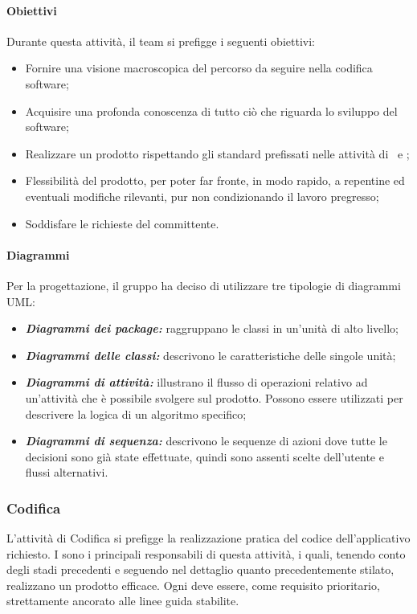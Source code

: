 		\paragraph{Obiettivi}
		Durante questa attività, il team si prefigge i seguenti obiettivi:
		\begin{itemize}
			\item Fornire una visione macroscopica del percorso da seguire nella codifica software;
			\item Acquisire una profonda conoscenza di tutto ciò che riguarda lo sviluppo del software;
			\item Realizzare un prodotto rispettando gli standard prefissati nelle attività di \SdF\ e \AdR;
			\item Flessibilità del prodotto, per poter far fronte, in modo rapido, a repentine ed eventuali modifiche rilevanti, pur non condizionando il lavoro pregresso;
			\item Soddisfare le richieste del committente.
		\end{itemize}
	\paragraph{Diagrammi}
	Per la progettazione, il gruppo ha deciso di utilizzare tre tipologie di diagrammi UML:
		\begin{itemize}
			\item \textbf{\textit{Diagrammi dei package:}} raggruppano le classi in un'unità di alto livello;
			\item \textbf{\textit{Diagrammi delle classi:}} descrivono le caratteristiche delle singole unità;
			\item \textbf{\textit{Diagrammi di attività:}} illustrano il flusso di operazioni relativo ad un'attività che è possibile svolgere sul prodotto. Possono essere utilizzati per descrivere la logica di un algoritmo specifico;
			\item \textbf{\textit{Diagrammi di sequenza:}} descrivono le sequenze di azioni dove tutte le decisioni sono già state effettuate, quindi sono assenti scelte dell'utente e flussi alternativi.
		\end{itemize}
	
	\subsubsection{Codifica}
	L'attività di Codifica si prefigge la realizzazione pratica del codice dell'applicativo richiesto. I \textit{\Progrs} sono i principali responsabili di questa attività, i quali, tenendo conto degli stadi precedenti e seguendo nel dettaglio quanto precedentemente stilato, realizzano un prodotto efficace. Ogni \textit{\Progr} deve essere, come requisito prioritario, strettamente ancorato alle linee guida stabilite.
	
